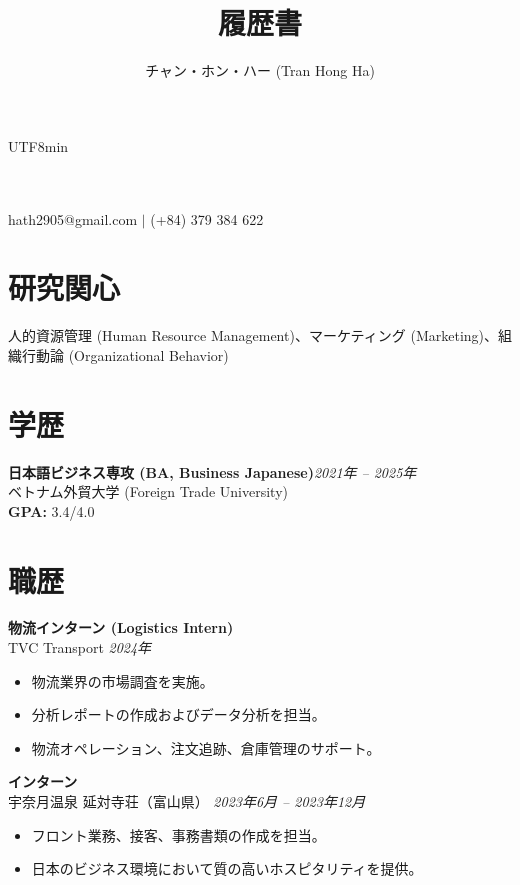 \documentclass[10.5pt]{article}
\makeatletter
\newcommand{\cvcolor}{\color{DodgerBlue4}}
\renewcommand{\maketitle}{
\begin{center}
{\Huge\theauthor}\\
\vspace{0.5em}
{\Large \cvcolor{履歴書}}\\
{\color{Gray}hath2905@gmail.com $|$ (+84) 379 384 622}
\end{center}
}
\makeatother
\begin{document}
\begin{CJK}{UTF8}{min}

\title{履歴書}
\author{チャン・ホン・ハー (Tran Hong Ha)}

\maketitle


\section{研究関心}
人的資源管理 (Human Resource Management)、マーケティング (Marketing)、組織行動論 (Organizational Behavior)


\section{学歴}

\textbf{日本語ビジネス専攻 (BA, Business Japanese)}\hfill\emph{2021年 -- 2025年}\\
ベトナム外貿大学 (Foreign Trade University) \\
\textbf{GPA:} 3.4/4.0


\section{職歴}

\textbf{物流インターン (Logistics Intern)} \hfill \\
TVC Transport \hfill \emph{2024年}
\vspace{-0.5em}
\begin{itemize}
\item 物流業界の市場調査を実施。
\item 分析レポートの作成およびデータ分析を担当。
\item 物流オペレーション、注文追跡、倉庫管理のサポート。
\end{itemize}

\textbf{インターン} \hfill \\
宇奈月温泉 延対寺荘（富山県） \hfill \emph{2023年6月 -- 2023年12月}
\vspace{-0.5em}
\begin{itemize}
\item フロント業務、接客、事務書類の作成を担当。
\item 日本のビジネス環境において質の高いホスピタリティを提供。
\end{itemize}


\end{CJK}
\end{document}
